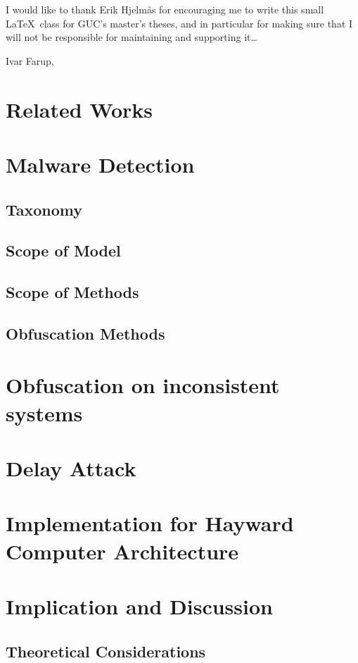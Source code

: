 \documentclass[medieteknikk]{gucmasterthesis}
\begin{document}
I would like to thank Erik Hjelmås for encouraging me to write this
small \LaTeX\ class for GUC's master's theses, and in particular for
making sure that I will not be responsible for maintaining and
supporting it\dots

\vspace{\baselineskip}
\noindent Ivar Farup, \gucmasterthesisdate
 
\tableofcontents
\listoffigures
\listoftables


\chapter{Related Works}
\chapter{Malware Detection}
	\section{Taxonomy}
	\section{Scope of Model}
	\section{Scope of Methods}
	\section{Obfuscation Methods}

\chapter{Obfuscation on inconsistent systems}
\chapter{Delay Attack}
\chapter{Implementation for Hayward Computer Architecture}
\chapter{Implication and Discussion}
	\section{Theoretical Considerations}
\end{document}
